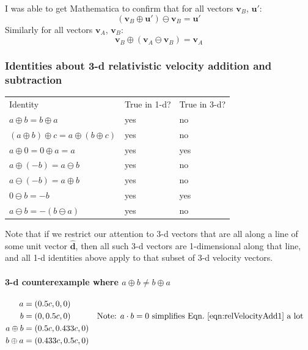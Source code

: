 \documentclass[a4paper]{article}
\theoremstyle{plain}
\theoremstyle{definition}
\newcommand{\vect}[1]{\mathbf{#1}}
\newcommand{\hatvec}[1]{\hat{\mathbf{#1}}}
\begin{document}
I was able to get Mathematica to confirm that
for all vectors $\vect{v}_B$, $\vect{u}'$:
\begin{equation}
(\vect{v}_B \oplus \vect{u}') \ominus \vect{v}_B = \vect{u}'
\end{equation}
Similarly for all vectors $\vect{v}_A$, $\vect{v}_B$:
\begin{equation}
\vect{v}_B \oplus (\vect{v}_A \ominus \vect{v}_B) = \vect{v}_A
\end{equation}


\subsubsection{Identities about 3-d relativistic velocity addition and subtraction}
\label{app:3drelvelocityadd-identities}

\begin{center}
\begin{tabularx}{1.0\textwidth}{|p{4cm}|p{2cm}|p{2cm}|}
\cline{1-3} \\
Identity & True in 1-d? & True in 3-d?
\\ \cline{1-3}
$a \oplus b = b \oplus a$ & yes & no
\\ \cline{1-3}
$(a \oplus b) \oplus c = a \oplus (b \oplus c)$ & yes & no
\\ \cline{1-3}
$a \oplus 0 = 0 \oplus a = a$ & yes & yes
\\ \cline{1-3}
$a \oplus (-b) = a \ominus b$ & yes & no
\\ \cline{1-3}
$a \ominus (-b) = a \oplus b$ & yes & no
\\ \cline{1-3}
$0 \ominus b = -b$ & yes & yes
\\ \cline{1-3}
$a \ominus b = - (b \ominus a)$ & yes & no
\\ \cline{1-3}
\end{tabularx}
\end{center}

Note that if we restrict our attention to 3-d vectors that are all
along a line of some unit vector $\hatvec{d}$, then all such 3-d
vectors are 1-dimensional along that line, and all 1-d identities
above apply to that subset of 3-d velocity vectors.

\paragraph{3-d counterexample where $a \oplus b \neq b \oplus a$}
\begin{align*}
  a & = (0.5c, 0, 0) \\
  b & = (0, 0.5c, 0) & & \text{Note: $a \cdot b = 0$ simplifies Eqn.~\eqref{eqn:relVelocityAdd1} a lot} \\
  a \oplus b & = (0.5c, 0.433c, 0) \\
  b \oplus a & = (0.433c, 0.5c, 0)
\end{align*}
\end{document}

